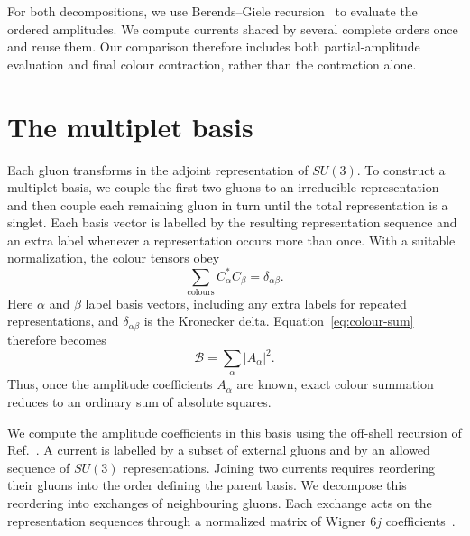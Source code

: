 \documentclass[aps,prd,twocolumn,superscriptaddress,nofootinbib]{revtex4-2}
\begin{document}
For both decompositions, we use Berends--Giele
recursion~\cite{Berends:1987me} to evaluate the ordered amplitudes.  We compute
currents shared by several complete orders once and reuse them.  Our comparison
therefore includes both partial-amplitude evaluation and final colour
contraction, rather than the contraction alone.

\section{The multiplet basis}
\label{sec:multiplet}

Each gluon transforms in the adjoint representation of $SU(3)$.  To construct
a multiplet basis, we couple the first two gluons to an irreducible
representation and then couple each remaining gluon in turn until the total
representation is a singlet.  Each basis vector is labelled by the resulting
representation sequence and an extra label whenever a representation occurs
more than once.  With a suitable normalization, the colour tensors obey
\begin{equation}
  \sum_{\text{colours}}
  C_{\alpha}^{*}C_{\beta}=\delta_{\alpha\beta}.
  \label{eq:multiplet-orthogonality}
\end{equation}
Here $\alpha$ and $\beta$ label basis vectors, including any extra labels for
repeated representations, and $\delta_{\alpha\beta}$ is the Kronecker delta.
Equation~\eqref{eq:colour-sum} therefore becomes
\begin{equation}
  \mathcal B=\sum_{\alpha}|A_{\alpha}|^2.
  \label{eq:multiplet-sum}
\end{equation}
Thus, once the amplitude coefficients $A_\alpha$ are known, exact colour
summation reduces to an ordinary sum of absolute squares.

We compute the amplitude coefficients in this basis using the off-shell
recursion of Ref.~\cite{Bolinder:2025gbj}.  A current is labelled by a subset
of external gluons and by an allowed sequence of $SU(3)$ representations.
Joining two currents requires reordering their gluons into the order defining
the parent basis.  We decompose this reordering into exchanges of neighbouring
gluons.  Each exchange acts on the representation sequences through a
normalized matrix of Wigner $6j$ coefficients~\cite{Sjodahl:2015qoa}.
\end{document}
